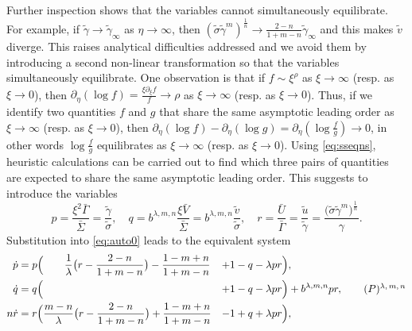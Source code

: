 \documentclass[a4paper,11pt]{article}
\def\bG{\bar{\Gamma}}
\def\bS{\bar{\Sigma}}
\def\bV{\bar{V}}
\def\bU{\bar{U}}
\def\tg{\tilde{\gamma}}
\def\ts{\tilde{\sigma}}
\def\tv{\tilde{v}}
\def\tu{\tilde{u}}
\numberwithin{step}{dummy}
\begin{document}
Further inspection shows that the variables cannot simultaneously equilibrate. For example, if $\tg \rightarrow \tg_\infty$ as $\eta \rightarrow \infty$, then $(\ts \tg^m)^{ \frac{1}{n} } \rightarrow \frac{2-n}{1+m-n}\tg_\infty$ and this makes $\tv$ diverge. 
This raises analytical difficulties addressed and we avoid them by introducing a second non-linear transformation so that the variables simultaneously equilibrate. 
One observation is that if $f \sim \xi^\rho$ as $\xi \rightarrow \infty$ (resp. as $\xi \rightarrow 0$), then $\partial_\eta(\log f) = \frac{\xi \partial_\xi f}{f} \rightarrow \rho$ 
 as $\xi \rightarrow \infty$ (resp. as $\xi \rightarrow 0$). 
Thus, if we  identify two quantities $f$ and $g$ that share the same asymptotic leading order as $\xi \rightarrow \infty$ (resp. as $\xi \rightarrow 0$), then $\partial_\eta(\log f) - \partial_\eta(\log g) = \partial_\eta(\log \frac{f}{g}) \rightarrow 0$,  in other words $\log \frac{f}{g}$ equilibrates as $\xi \rightarrow \infty$ (resp. as $\xi \rightarrow 0$). 
Using \eqref{eq:sseqns}, heuristic calculations can be carried out to find which three pairs of quantities are expected to share the same asymptotic leading order. 
This suggests to introduce the variables
\begin{equation}  
\label{eq:ratios}
 p= \frac{\xi^2\bG}{\bS}=\frac{ \tg}{ \ts}, \quad
 q= b^{\lambda,m,n}\frac{\xi\bV}{\bS}=b^{\lambda,m,n}\frac{ \tv}{\ts}, \quad
 r=\frac{\bU}{\bG} = \frac{\tu}{\tg} = \frac{ \big(\ts \tg^m\big)^\frac{1}{n} }{ \gamma }. %
\end{equation}
Substitution into \eqref{eq:auto0} leads to the equivalent system
{\small
\begin{align} 
 \dot{p} &=p\Big( ~~~~~~\frac{1}{ \lambda }\big(r - \frac{2-n}{1+m-n}\big) - \frac{1-m+n}{1+m-n} &+&1-q- \lambda p r\Big), \nonumber \\
 \dot{q} &=q\Big(                                                                          &+&1-q- \lambda p r\Big) + b^{\lambda,m,n}pr,\tag*{$(P)$\textsuperscript{$\lambda,m,n$}}\label{eq:pqrsystem}\\
 n\dot{r}&=r\Big( \frac{m-n}{ \lambda }\big(r - \frac{2-n}{1+m-n}\big) + \frac{1-m+n}{1+m-n} &-&1+q+ \lambda p r\Big), \quad   \nonumber
\end{align}
}
\end{document}
